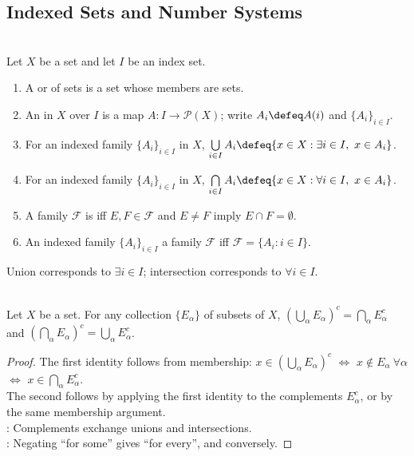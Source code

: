 \subsection{Indexed Sets and Number Systems}

\begin{definition} \label{def:indexed-families-unions-intersections} \label{def:disjoint-families-and-parametrizations} \\
Let $X$ be a set and let $I$ be an index set.
\begin{enumerate}[label=(\roman*)]
\setlength{\itemsep}{0pt}
\item A  or  of sets is a set whose members are sets.
\item An  in $X$ over $I$ is a map $A:I\to\mathcal{P}(X)$; write $A_i\defeq A(i)$ and $\{A_i\}_{i\in I}$.
\item For an indexed family $\{A_i\}_{i\in I}$ in $X$, $\bigcup\limits_{i\in I}A_i\defeq\{x\in X:\exists i\in I,\ x\in A_i\}$.
\item For an indexed family $\{A_i\}_{i\in I}$ in $X$, $\bigcap\limits_{i\in I}A_i\defeq\{x\in X:\forall i\in I,\ x\in A_i\}$.
\item A family $\mathcal{F}$ is  iff $E,F\in\mathcal{F}$ and $E\neq F$ imply $E\cap F=\emptyset$.
\item An indexed family $\{A_i\}_{i\in I}$  a family $\mathcal{F}$ iff $\mathcal{F}=\{A_i:i\in I\}$.
\end{enumerate}
Union corresponds to $\exists i\in I$; intersection corresponds to $\forall i\in I$.
\end{definition}

\begin{theorem} \label{thm:metric-de-morgan-laws} \\
Let $X$ be a set. For any collection $\{E_\alpha\}$ of subsets of $X$, $\left(\bigcup\limits_\alpha E_\alpha\right)^c=\bigcap\limits_\alpha E_\alpha^c$ and $\left(\bigcap\limits_\alpha E_\alpha\right)^c=\bigcup\limits_\alpha E_\alpha^c$.
\begin{proof}
The first identity follows from membership: $x\in\left(\bigcup\limits_\alpha E_\alpha\right)^c$ $\Longleftrightarrow$ $x\notin E_\alpha \ \forall \alpha$ $\Longleftrightarrow$ $x\in\bigcap\limits_\alpha E_\alpha^c$.\\
The second follows by applying the first identity to the complements $E_\alpha^c$, or by the same membership argument.\\
: Complements exchange unions and intersections.\\
: Negating ``for some'' gives ``for every'', and conversely.
\end{proof}
\end{theorem}

